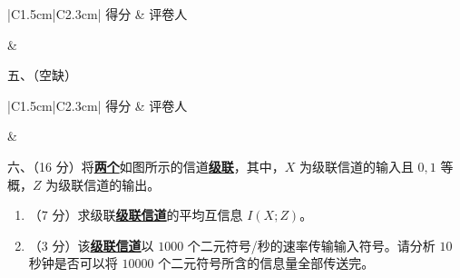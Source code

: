 \documentclass[UTF8,a4paper,12pt]{ctexart}
\begin{document}
\vspace{2.0em}

\noindent
\begin{minipage}[t]{0.26\textwidth}
\renewcommand{\arraystretch}{1.5}
\begin{tabular}{|C{1.5cm}|C{2.3cm}|}
\hline
得分 & 评卷人 \\
\hline
\rule{0pt}{0.8cm}&  \\
\hline
\end{tabular}
\end{minipage}
\hspace{0.02\textwidth}
\begin{minipage}[t]{0.68\textwidth}
{\heiti 五、（空缺）}
\end{minipage}

\newpage

\noindent
\begin{minipage}[t]{0.26\textwidth}
\renewcommand{\arraystretch}{1.5}
\begin{tabular}{|C{1.5cm}|C{2.3cm}|}
\hline
得分 & 评卷人 \\
\hline
\rule{0pt}{0.8cm}&  \\
\hline
\end{tabular}

\vspace{1.0em}

\begin{center}
\end{center}
\end{minipage}
\hspace{0.02\textwidth}
\begin{minipage}[t]{0.68\textwidth}
{\heiti 六、（16 分）}将\underline{\textbf{两个}}如图所示的信道\underline{\textbf{级联}}，其中，$X$ 为级联信道的输入且 $0,1$ 等概，$Z$ 为级联信道的输出。

\vspace{0.8em}

\begin{enumerate}[label=\arabic*., leftmargin=2em]

\item （7 分）求级联\underline{\textbf{级联信道}}的平均互信息 $I(X;Z)$。

\item （3 分）该\underline{\textbf{级联信道}}以 $1000$ 个二元符号/秒的速率传输输入符号。请分析 $10$ 秒钟是否可以将 $10000$ 个二元符号所含的信息量全部传送完。

\end{enumerate}
\end{minipage}
\end{document}
